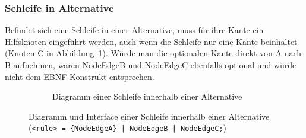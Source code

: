 \documentclass[../InterneDSLs.tex]{subfiles}
\begin{document}
\subsubsection{Schleife in Alternative}
Befindet sich eine Schleife in einer Alternative, muss für ihre Kante ein Hilfsknoten eingeführt werden, auch wenn die Schleife nur eine Kante beinhaltet (Knoten C in Abbildung~\ref{FIG:DiagramLoopInAlternative}). Würde man die optionalen Kante direkt von A nach B aufnehmen, wären NodeEdgeB und NodeEdgeC ebenfalls optional und würde nicht dem EBNF-Konstrukt entsprechen.
\begin{figure}[ht]
\centering
  \begin{subfigure}[c]{0.49\textwidth}
    \caption{Diagramm einer Schleife innerhalb einer Alternative}
    \label{FIG:DiagramLoopInAlternative}
  \end{subfigure}
  \begin{subfigure}[c]{0.49\textwidth}
    
  \end{subfigure}
  \caption[Abbildung einer Schleife innerhalb einer Alternative]{Diagramm und Interface einer Schleife innerhalb einer Alternative (\texttt{<rule> = \{NodeEdgeA\} | NodeEdgeB | NodeEdgeC;})}
  \label{FIG:LoopInAlternative}
\end{figure}
\end{document}
